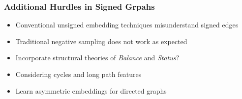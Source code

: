 \documentclass{beamer}
\begin{document}
\begin{frame}
    \frametitle{Additional Hurdles in Signed Grpahs}
    \begin{itemize}
        \item Conventional unsigned embedding techniques misunderstand signed edges
        \item Traditional negative sampling does not work as expected
        \item Incorporate structural theories of \textit{Balance} and \textit{Status}?
        \item Considering cycles and long path features
        \item Learn asymmetric embeddings for directed graphs
    \end{itemize}

\end{frame}
\end{document}
